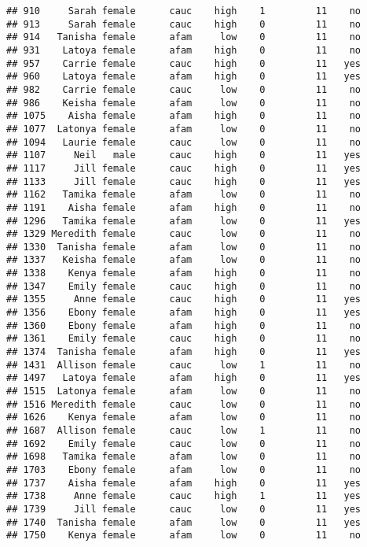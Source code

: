 \documentclass[
]{article}
\begin{document}
\begin{verbatim}
## 910     Sarah female      cauc    high    1         11    no
## 913     Sarah female      cauc    high    0         11    no
## 914   Tanisha female      afam     low    0         11    no
## 931    Latoya female      afam    high    0         11    no
## 957    Carrie female      cauc    high    0         11   yes
## 960    Latoya female      afam    high    0         11   yes
## 982    Carrie female      cauc     low    0         11    no
## 986    Keisha female      afam     low    0         11    no
## 1075    Aisha female      afam    high    0         11    no
## 1077  Latonya female      afam     low    0         11    no
## 1094   Laurie female      cauc     low    0         11    no
## 1107     Neil   male      cauc    high    0         11   yes
## 1117     Jill female      cauc    high    0         11   yes
## 1133     Jill female      cauc    high    0         11   yes
## 1162   Tamika female      afam     low    0         11    no
## 1191    Aisha female      afam    high    0         11    no
## 1296   Tamika female      afam     low    0         11   yes
## 1329 Meredith female      cauc     low    0         11    no
## 1330  Tanisha female      afam     low    0         11    no
## 1337   Keisha female      afam     low    0         11    no
## 1338    Kenya female      afam    high    0         11    no
## 1347    Emily female      cauc    high    0         11    no
## 1355     Anne female      cauc    high    0         11   yes
## 1356    Ebony female      afam    high    0         11   yes
## 1360    Ebony female      afam    high    0         11    no
## 1361    Emily female      cauc    high    0         11    no
## 1374  Tanisha female      afam    high    0         11   yes
## 1431  Allison female      cauc     low    1         11    no
## 1497   Latoya female      afam    high    0         11   yes
## 1515  Latonya female      afam     low    0         11    no
## 1516 Meredith female      cauc     low    0         11    no
## 1626    Kenya female      afam     low    0         11    no
## 1687  Allison female      cauc     low    1         11    no
## 1692    Emily female      cauc     low    0         11    no
## 1698   Tamika female      afam     low    0         11    no
## 1703    Ebony female      afam     low    0         11    no
## 1737    Aisha female      afam    high    0         11   yes
## 1738     Anne female      cauc    high    1         11   yes
## 1739     Jill female      cauc     low    0         11   yes
## 1740  Tanisha female      afam     low    0         11   yes
## 1750    Kenya female      afam     low    0         11    no

\end{verbatim}
\end{document}
